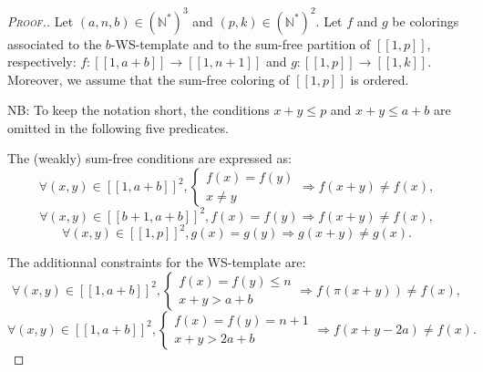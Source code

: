 \begin{proof}[\textsc{Proof.}]
\begin{sloppypar}
Let \((a,n,b) \in (\mathbb{N}^*)^3\) and \((p,k) \in (\mathbb{N}^*)^2\). Let \(f\) and \(g\) be colorings associated 
to the \(b\)-WS-template and to the sum-free partition of \([\![1,p]\!]\), respectively: 
\({f : [\![1, a + b]\!] \longrightarrow [\![1,n+1]\!]}\) and \({g : [\![1, p]\!]  \longrightarrow [\![1, k]\!]}\). Moreover, 
we assume that the sum-free coloring of \([\![1, p]\!]\) is ordered.
\end{sloppypar}

\par
NB: To keep the notation short, the conditions \(x + y \leqslant p\)  and \(x + y \leqslant a + b\) are omitted in the following five predicates.
\par
The (weakly) sum-free conditions are expressed as:
\begin{equation}
\forall (x,y) \in [\![1,a + b]\!]^2, \left\{
\begin{array}{l}
	f(x) = f(y) \\
	x \neq y
\end{array}
\right. \Longrightarrow f(x+y) \neq f(x),
\end{equation}
\begin{equation}
\forall (x,y) \in [\![b+1,a + b]\!]^2, f(x) = f(y) \Longrightarrow f(x+y) \neq f(x),
\end{equation}
\begin{equation}
\forall (x,y) \in [\![1,p]\!]^2, g(x) = g(y) \Longrightarrow g(x+y) \neq g(x).
\end{equation}

The additionnal constraints for the WS-template are:
\begin{equation}
\forall (x,y) \in [\![1,a + b]\!]^2, \left\{
\begin{array}{l}
	f(x) = f(y) \leqslant n \\
	x + y > a + b
\end{array}
\right. \Longrightarrow f(\pi(x+y)) \neq f(x),
\end{equation}
\begin{equation}
\forall (x,y) \in [\![1,a + b]\!]^2, \left\{
\begin{array}{l}
	f(x) = f(y) = n + 1 \\
	x + y > 2 a + b
\end{array}
\right. \Longrightarrow f(x+y - 2 a) \neq f(x).
\end{equation}


\end{proof}

